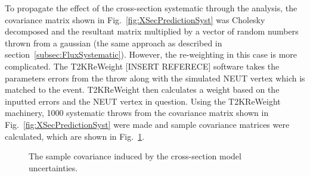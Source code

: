 \newline
\newline
To propagate the effect of the cross-section systematic through the analysis, the covariance matrix shown in Fig.~\ref{fig:XSecPredictionSyst} was Cholesky decomposed and the resultant matrix multiplied by a vector of random numbers thrown from a gaussian (the same approach as described in section~\ref{subsec:FluxSystematic}).  However, the re-weighting in this case is more complicated.  The T2KReWeight [INSERT REFERECE] software takes the parameters errors from the throw along with the simulated NEUT vertex which is matched to the event.  T2KReWeight then calculates a weight based on the inputted errors and the NEUT vertex in question.  Using the T2KReWeight machinery, 1000 systematic throws from the covariance matrix shown in Fig.~\ref{fig:XSecPredictionSyst} were made and sample covariance matrices were calculated, which are shown in Fig.~\ref{fig:XSecCovarianceMatrices}.
\begin{figure}%
  \centering
  \caption{The sample covariance induced by the cross-section model uncertainties.}
  \label{fig:XSecCovarianceMatrices}
\end{figure}
\newline
